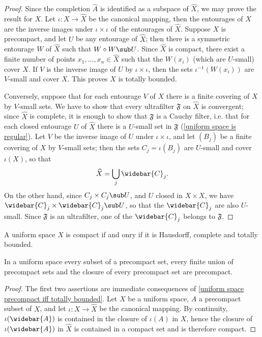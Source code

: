 \begin{proof}
Since the completion $\widehat{A}$ is identified as a subspace of $\widehat{X}$, we may prove the result for $X$. Let $\iota:X\to\widehat{X}$ be the canonical mapping, then the entourages of $X$ are the inverse images under $\iota\times\iota$ of the entourages of $\widehat{X}$. Suppose $X$ is precompact, and let $U$ be any entourage of $\widehat{X}$; then there is a symmetric entourage $W$ of $\widehat{X}$ such that $W\circ W\sub U$. Since $\widehat{X}$ is compact, there exist a finite number of points $x_1,\dots,x_n\in\widehat{X}$ such that the $W(x_i)$ (which are $U$-small) cover $X$. If $V$ is the inverse image of $U$ by $\iota\times\iota$, then the sets $\iota^{-1}(W(x_i))$ are $V$-small and cover $X$. This proves $X$ is totally bounded.\par
Conversely, suppose that for each entourage $V$ of $X$ there is a finite covering of $X$ by $V$-small sets. We have to show that every ultrafilter $\mathfrak{F}$ on $\widehat{X}$ is convergent; since $\widehat{X}$ is complete, it is enough to show that $\mathfrak{F}$ is a Cauchy filter, i.e. that for each closed entourage $U$ of $\widehat{X}$ there is a $U$-small set in $\mathfrak{F}$ (\cref{uniform space is regular}). Let $V$ be the inverse image of $U$ under $\iota\times\iota$, and let $(B_j)$ be a finite covering of $X$ by $V$-small sets; then the sets $C_j=\iota(B_j)$ are $U$-small and cover $\iota(X)$, so that
\[\widehat{X}=\bigcup_{j}\widebar{C}_j.\]
On the other hand, since $C_j\times C_j\sub U$, and $U$ closed in $X\times X$, we have $\widebar{C}_j\times\widebar{C}_j\sub U$, so that the $\widebar{C}_j$ are also $U$-small. Since $\mathfrak{F}$ is an ultrafilter, one of the $\widebar{C}_j$ belongs to $\mathfrak{F}$.
\end{proof}
\begin{corollary}
A uniform space $X$ is compact if and onry if it is Hausdorff, complete and totally bounded.
\end{corollary}
\begin{proposition}\label{uniform space precompact union closure}
In a uniform space every subset of a precompact set, every finite union of precompact sets and the closure of every precompact set are precompact.
\end{proposition}
\begin{proof}
The first two assertions are immediate consequences of \cref{uniform space precompact iff totally bounded}. Let $X$ be a uniform space, $A$ a precompact subset of $X$, and let $\iota:X\to\widehat{X}$ be the canonical mapping. By continuity, $\iota(\widebar{A})$ is contained in the closure of $\iota(A)$ in $X$, hence the closure of $\iota(\widebar{A})$ in $\widehat{X}$ is contained in a compact set and is therefore compact.
\end{proof}
